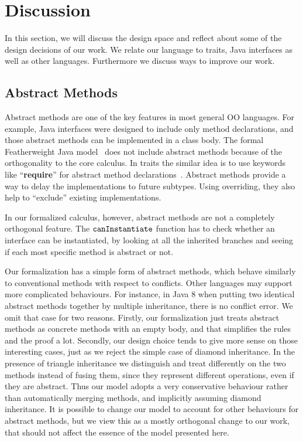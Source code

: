 \section{Discussion}\label{sec:discussion}
In this section, we will discuss the design space and reflect about some of the design decisions of our work. We relate 
our language to traits, Java interfaces as well as other languages. Furthermore we discuss
ways to improve our  work. 

\subsection{Abstract Methods}

Abstract methods are one of the key features in most general OO languages. For example, Java interfaces were designed
to include only method declarations, and those abstract methods can be implemented in a class body. 
The formal Featherweight Java model~\cite{Igarashi01FJ} does not include abstract methods because of the orthogonality
to the core calculus. In traits the
similar idea is to use keywords like ``\textbf{require}'' for abstract method declarations~\cite{scharli03traits}.
Abstract methods provide a way to
delay the implementations to future subtypes. Using overriding, they also help to ``exclude'' existing implementations.

In our formalized calculus, however, abstract methods are not a completely orthogonal feature. The $\texttt{canInstantiate}$ function
has to check whether an interface can be instantiated, by looking at all the inherited branches and seeing if each most specific method
is abstract or not.

Our formalization has a simple form of abstract methods, which behave similarly to conventional methods with respect to conflicts.
Other languages may support more complicated behaviours.
For instance, in Java 8 when putting two identical abstract methods together by multiple inheritance, there is no conflict error. We omit
that case for two reasons. Firstly, our formalization just treats abstract methods as concrete methods with an empty body, and that simplifies
the rules and the proof a lot. Secondly, our design choice tends to give more sense on those interesting cases, just as we reject the simple case of diamond inheritance.
 In the presence of triangle inheritance we distinguish and treat differently on the two methods instead of fusing them, since they represent different operations, even if they are abstract. Thus our model adopts a very conservative behaviour rather than automatically merging 
methods, and implicitly assuming diamond inheritance. 
It is possible to change our model to account for other behaviours for abstract methods, but we view this as a mostly 
orthogonal change to our work, that should not affect the essence of the model presented here.

